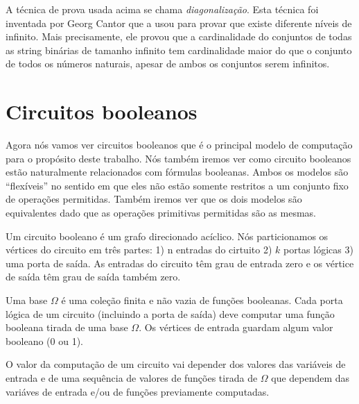 A técnica de prova usada acima se chama \emph{diagonalização}. Esta técnica foi inventada por Georg Cantor que a usou para provar que existe diferente níveis de infinito. Mais precisamente, ele provou que a cardinalidade do conjuntos de todas as string binárias de tamanho infinito tem cardinalidade maior do que o conjunto de todos os números naturais, apesar de ambos os conjuntos serem infinitos.

\section{Circuitos booleanos} \label{circuitos}

Agora nós vamos ver circuitos booleanos que é o principal modelo de computação para o propósito deste trabalho. Nós também iremos ver como circuito booleanos estão naturalmente relacionados com fórmulas booleanas. Ambos os modelos são ``flexíveis'' no sentido em que eles não estão somente restritos a um conjunto fixo de operações permitidas. Também iremos ver que os dois modelos são equivalentes dado que as operações primitivas permitidas são as mesmas.

Um circuito booleano é um grafo direcionado acíclico. Nós particionamos os vértices do circuito em três partes: 1) n entradas do cirtuito 2) $k$ portas lógicas 3) uma porta de saída. As entradas do circuito têm grau de entrada zero e os vértice de saída têm grau de saída também zero.

Uma base $\Omega$ é uma coleção finita e não vazia de funções booleanas. Cada porta lógica de um circuito (incluindo a porta de saída) deve computar uma função booleana tirada de uma base $\Omega$. Os vértices de entrada guardam algum valor booleano (0 ou 1).

O valor da computação de um circuito vai depender dos valores das variáveis de entrada e de uma sequência de valores de funções tirada de $\Omega$ que dependem das variáves de entrada e/ou de funções previamente computadas.

